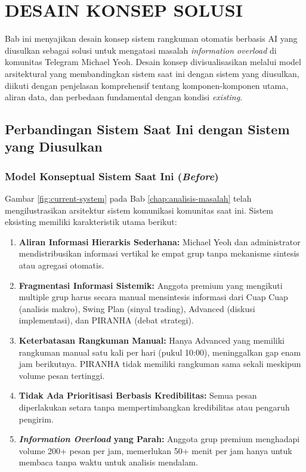 \chapter{DESAIN KONSEP SOLUSI}
\label{chap:desain-konsep-solusi}

Bab ini menyajikan desain konsep sistem rangkuman otomatis berbasis AI yang diusulkan sebagai solusi untuk mengatasi masalah \textit{information overload} di komunitas Telegram Michael Yeoh. Desain konsep divisualisasikan melalui model arsitektural yang membandingkan sistem saat ini dengan sistem yang diusulkan, diikuti dengan penjelasan komprehensif tentang komponen-komponen utama, aliran data, dan perbedaan fundamental dengan kondisi \textit{existing}.

\section{Perbandingan Sistem Saat Ini dengan Sistem yang Diusulkan}
\label{sec:before-after-comparison}

\subsection{Model Konseptual Sistem Saat Ini (\textit{Before})}

Gambar \ref{fig:current-system} pada Bab \ref{chap:analisis-masalah} telah mengilustrasikan arsitektur sistem komunikasi komunitas saat ini. Sistem eksisting memiliki karakteristik utama berikut:

\begin{enumerate}
\item \textbf{Aliran Informasi Hierarkis Sederhana:} Michael Yeoh dan administrator mendistribusikan informasi vertikal ke empat grup tanpa mekanisme sintesis atau agregasi otomatis.

\item \textbf{Fragmentasi Informasi Sistemik:} Anggota premium yang mengikuti multiple grup harus secara manual mensintesis informasi dari Cuap Cuap (analisis makro), Swing Plan (sinyal trading), Advanced (diskusi implementasi), dan PIRANHA (debat strategi).

\item \textbf{Keterbatasan Rangkuman Manual:} Hanya Advanced yang memiliki rangkuman manual satu kali per hari (pukul 10:00), meninggalkan gap enam jam berikutnya. PIRANHA tidak memiliki rangkuman sama sekali meskipun volume pesan tertinggi.

\item \textbf{Tidak Ada Prioritisasi Berbasis Kredibilitas:} Semua pesan diperlakukan setara tanpa mempertimbangkan kredibilitas atau pengaruh pengirim.

\item \textbf{\textit{Information Overload} yang Parah:} Anggota grup premium menghadapi volume 200+ pesan per jam, memerlukan 50+ menit per jam hanya untuk membaca tanpa waktu untuk analisis mendalam.
\end{enumerate}

